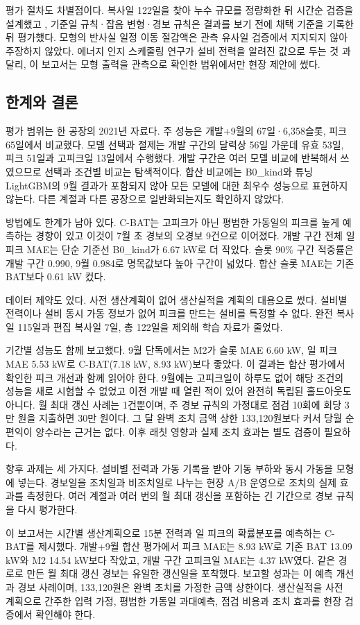 평가 절차도 차별점이다. 복사일 122일을 찾아 누수 규모를 정량화한 뒤 시간순 검증을 설계했고 \citep{kapoor2023leakage}, 기준일 규칙·잡음 변형·경보 규칙은 결과를 보기 전에 채택 기준을 기록한 뒤 평가했다. 모형의 반사실 일정 이동 절감액은 관측 유사일 검증에서 지지되지 않아 주장하지 않았다. 에너지 인지 스케줄링 연구가 설비 전력을 알려진 값으로 두는 것 \citep{fang2011peakpower,shrouf2014tou}과 달리, 이 보고서는 모형 출력을 관측으로 확인한 범위에서만 현장 제안에 썼다.

\subsection{한계와 결론}

평가 범위는 한 공장의 2021년 자료다. 주 성능은 개발+9월의 67일·6,358슬롯, 피크 65일에서 비교했다. 모델 선택과 절제는 개발 구간의 달력상 56일 가운데 유효 53일, 피크 51일과 고피크일 13일에서 수행했다. 개발 구간은 여러 모델 비교에 반복해서 쓰였으므로 선택과 조건별 비교는 탐색적이다. 합산 비교에는 B0\_kind와 튜닝 LightGBM의 9월 결과가 포함되지 않아 모든 모델에 대한 최우수 성능으로 표현하지 않는다. 다른 계절과 다른 공장으로 일반화되는지도 확인하지 않았다.

방법에도 한계가 남아 있다. C-BAT는 고피크가 아닌 평범한 가동일의 피크를 높게 예측하는 경향이 있고 이것이 7월 초 경보의 오경보 9건으로 이어졌다. 개발 구간 전체 일 피크 MAE는 단순 기준선 B0\_kind가 6.67 kW로 더 작았다. 슬롯 90\% 구간 적중률은 개발 구간 0.990, 9월 0.984로 명목값보다 높아 구간이 넓었다. 합산 슬롯 MAE는 기존 BAT보다 0.61 kW 컸다.

데이터 제약도 있다. 사전 생산계획이 없어 생산실적을 계획의 대용으로 썼다. 설비별 전력이나 설비 동시 가동 정보가 없어 피크를 만드는 설비를 특정할 수 없다. 완전 복사일 115일과 편집 복사일 7일, 총 122일을 제외해 학습 자료가 줄었다.

기간별 성능도 함께 보고했다. 9월 단독에서는 M2가 슬롯 MAE 6.60 kW, 일 피크 MAE 5.53 kW로 C-BAT(7.18 kW, 8.93 kW)보다 좋았다. 이 결과는 합산 평가에서 확인한 피크 개선과 함께 읽어야 한다. 9월에는 고피크일이 하루도 없어 해당 조건의 성능을 새로 시험할 수 없었고 이전 개발 때 열린 적이 있어 완전히 독립된 홀드아웃도 아니다. 월 최대 갱신 사례는 1건뿐이며, 주 경보 규칙의 가정대로 점검 10회에 회당 3만 원을 지출하면 30만 원이다. 그 달 완벽 조치 금액 상한 133,120원보다 커서 당월 순편익이 양수라는 근거는 없다. 이후 래칫 영향과 실제 조치 효과는 별도 검증이 필요하다.

향후 과제는 세 가지다. 설비별 전력과 가동 기록을 받아 기동 부하와 동시 가동을 모형에 넣는다. 경보일을 조치일과 비조치일로 나누는 현장 A/B 운영으로 조치의 실제 효과를 측정한다. 여러 계절과 여러 번의 월 최대 갱신을 포함하는 긴 기간으로 경보 규칙을 다시 평가한다.

이 보고서는 시간별 생산계획으로 15분 전력과 일 피크의 확률분포를 예측하는 C-BAT를 제시했다. 개발+9월 합산 평가에서 피크 MAE는 8.93 kW로 기존 BAT 13.09 kW와 M2 14.54 kW보다 작았고, 개발 구간 고피크일 MAE는 4.37 kW였다. 같은 경로로 만든 월 최대 갱신 경보는 유일한 갱신일을 포착했다. 보고할 성과는 이 예측 개선과 경보 사례이며, 133,120원은 완벽 조치를 가정한 금액 상한이다. 생산실적을 사전 계획으로 간주한 입력 가정, 평범한 가동일 과대예측, 점검 비용과 조치 효과를 현장 검증에서 확인해야 한다.
